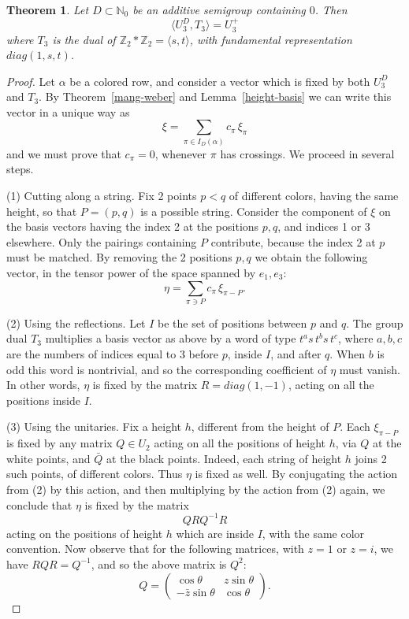 \documentclass[11pt,a4paper]{article}
\newtheorem{thm}{Theorem}[section]
\begin{document}
\begin{thm}\label{generation-three}
Let $D\subset\mathbb N_0$ be an additive semigroup containing $0$. Then
\[
 \langle U_3^D,T_3\rangle=U_3^+
\]
where $T_3$ is the dual of $\mathbb Z_2*\mathbb Z_2=\langle s,t\rangle$, with fundamental representation $diag(1,s,t)$.
\end{thm}

\begin{proof}
Let $\alpha$ be a colored row, and consider a vector which is fixed by both $U_3^D$ and $T_3$. By Theorem~\ref{mang-weber} and Lemma~\ref{height-basis} we can write this vector in a unique way as
\[
 \xi=\sum_{\pi\in I_D(\alpha)}c_\pi\,\xi_\pi
\]
and we must prove that $c_\pi=0$, whenever $\pi$ has crossings. We proceed in several steps.

(1) Cutting along a string. Fix 2 points $p<q$ of different colors, having the same height, so that $P=(p,q)$ is a possible string. Consider the component of $\xi$ on the basis vectors having the index 2 at the positions $p,q$, and indices 1 or 3 elsewhere. Only the pairings containing $P$ contribute, because the index 2 at $p$ must be matched. By removing the 2 positions $p,q$ we obtain the following vector, in the tensor power of the space spanned by $e_1,e_3$:
\[
 \eta=\sum_{\pi\ni P}c_\pi\,\xi_{\pi-P}.
\]

(2) Using the reflections. Let $I$ be the set of positions between $p$ and $q$. The group dual $T_3$ multiplies a basis vector as above by a word of type $t^as\,t^bs\,t^c$, where $a,b,c$ are the numbers of indices equal to 3 before $p$, inside $I$, and after $q$. When $b$ is odd this word is nontrivial, and so the corresponding coefficient of $\eta$ must vanish. In other words, $\eta$ is fixed by the matrix $R=diag(1,-1)$, acting on all the positions inside $I$.

(3) Using the unitaries. Fix a height $h$, different from the height of $P$. Each $\xi_{\pi-P}$ is fixed by any matrix $Q\in U_2$ acting on all the positions of height $h$, via $Q$ at the white points, and $\bar Q$ at the black points. Indeed, each string of height $h$ joins 2 such points, of different colors. Thus $\eta$ is fixed as well. By conjugating the action from (2) by this action, and then multiplying by the action from (2) again, we conclude that $\eta$ is fixed by the matrix
\[
 QRQ^{-1}R
\]
acting on the positions of height $h$ which are inside $I$, with the same color convention. Now observe that for the following matrices, with $z=1$ or $z=i$, we have $RQR=Q^{-1}$, and so the above matrix is $Q^2$:
\[
 Q=\begin{pmatrix}\cos\theta&z\sin\theta\\-\bar z\sin\theta&\cos\theta\end{pmatrix}.
\]


\end{proof}
\end{document}
